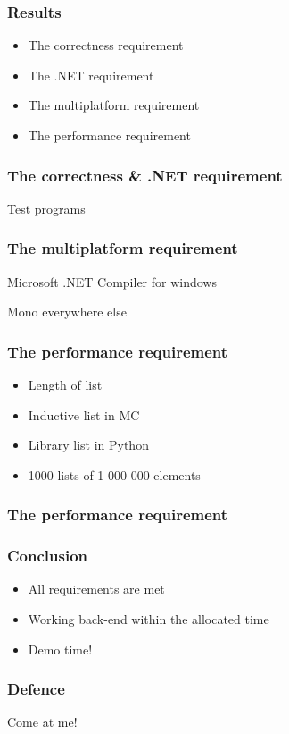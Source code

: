 \documentclass[xetex,serif]{beamer}
\begin{document}
\begin{frame}[t]
\end{frame}\begin{frame}\frametitle{Results}
\begin{itemize}
    \item The correctness requirement
    \item The .NET requirement
    \item The multiplatform requirement
    \item The performance requirement
\end{itemize}

\end{frame}\begin{frame}\frametitle{The correctness \& .NET requirement}
    Test programs

\end{frame}\begin{frame}\frametitle{The multiplatform requirement}
    Microsoft .NET Compiler for windows

    Mono everywhere else

\end{frame}\begin{frame}\frametitle{The performance requirement}
\begin{itemize}
    \item Length of list
    \item Inductive list in MC
    \item Library list in Python
    \item 1000 lists of 1 000 000 elements
\end{itemize}

\end{frame}\begin{frame}\frametitle{The performance requirement}

\end{frame}\begin{frame}\frametitle{Conclusion}
\begin{itemize}
    \item All requirements are met
    \item Working back-end within the allocated time
    \item Demo time!
\end{itemize}

\end{frame}\begin{frame}\frametitle{Defence}
    Come at me!

\end{frame}
\end{document}
